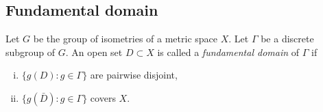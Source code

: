 \documentclass[a4paper]{article}
\begin{document}
\subsection{Fundamental domain}




\begin{prb}
Let $G$ be the group of isometries of a metric space $X$.
Let $\Gamma$ be a discrete subgroup of $G$.
An open set $D\subset X$ is called a \emph{fundamental domain} of $\Gamma$ if
\begin{enumerate}[(i)]
\item $\{g(D):g\in\Gamma\}$ are pairwise disjoint,
\item $\{g(\bar D):g\in\Gamma\}$ covers $X$.
\end{enumerate}
\end{prb}
\end{document}
